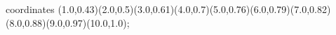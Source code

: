 					coordinates { (1.0,0.43)(2.0,0.5)(3.0,0.61)(4.0,0.7)(5.0,0.76)(6.0,0.79)(7.0,0.82)(8.0,0.88)(9.0,0.97)(10.0,1.0)};